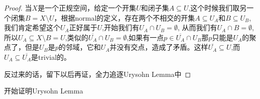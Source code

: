 \documentclass{article}
\begin{document}
\begin{proof}
当$X$是一个正规空间，给定一个开集$U$和闭子集$A \subseteq U$,这个时候我们取另一个闭集$B = X \setminus U$，根据normal的定义，存在两个不相交的开集$A \subseteq U_A$和$B \subseteq U_B$,我们肯定希望这个$U_A$正好属于$U$,开始我们有$U_A \cap U_B = \emptyset$, 从而我们有$U_A \cap B = \emptyset$,所以$U_A \subseteq X \setminus B = U$,类似的$\overline{U_A} \cap U_B = \emptyset$,如果有一点$p \in \overline{U_A} \cap U_B$那$p$只能是$U_A$的聚点了，但是$U_B$是$p$的邻域，它和$U_A$并没有交点，造成了矛盾。这样$\overline{U_A} \subseteq U$,而$U_A \subseteq \overline{U_A}$是trivial的。

反过来的话，留下以后再证，全力追逐Urysohn Lemma中
\end{proof}

开始证明Urysohn Lemma
\end{document}

